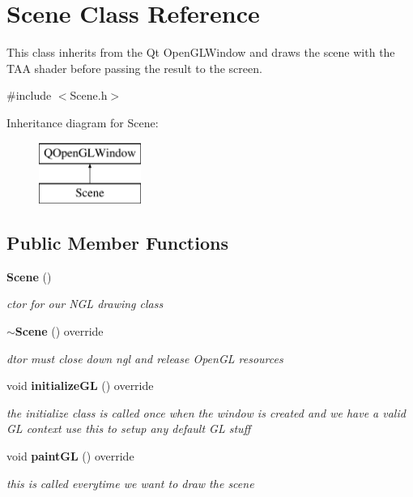 \section{Scene Class Reference}
\label{class_scene}


This class inherits from the Qt Open\+G\+L\+Window and draws the scene with the T\+AA shader before passing the result to the screen.  




{\ttfamily \#include $<$Scene.\+h$>$}

Inheritance diagram for Scene\+:\begin{figure}[H]
\begin{center}
\leavevmode
\includegraphics[height=2.000000cm]{class_scene}
\end{center}
\end{figure}
\subsection*{Public Member Functions}
\begin{DoxyCompactItemize}
\item 
\textbf{ Scene} ()
\begin{DoxyCompactList}\small\item\em ctor for our N\+GL drawing class \end{DoxyCompactList}\item 
\textbf{ $\sim$\+Scene} () override
\begin{DoxyCompactList}\small\item\em dtor must close down ngl and release Open\+GL resources \end{DoxyCompactList}\item 
void \textbf{ initialize\+GL} () override
\begin{DoxyCompactList}\small\item\em the initialize class is called once when the window is created and we have a valid GL context use this to setup any default GL stuff \end{DoxyCompactList}\item 
void \textbf{ paint\+GL} () override
\begin{DoxyCompactList}\small\item\em this is called everytime we want to draw the scene \end{DoxyCompactList}\end{DoxyCompactItemize}
